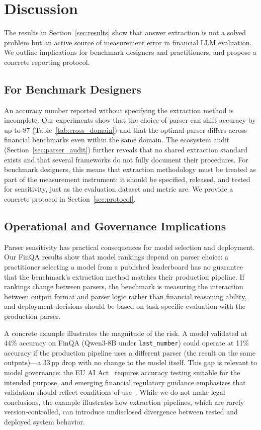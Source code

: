 \section{Discussion}
\label{sec:implications}

The results in Section~\ref{sec:results} show that answer extraction is not a solved problem but an active source of measurement error in financial LLM evaluation. We outline implications for benchmark designers and practitioners, and propose a concrete reporting protocol.

\subsection{For Benchmark Designers}
\label{sec:impl_benchmark}

An accuracy number reported without specifying the extraction method is incomplete. Our experiments show that the choice of parser can shift accuracy by up to 87\pp{} (Table~\ref{tab:cross_domain}) and that the optimal parser differs across financial benchmarks even within the same domain. The ecosystem audit (Section~\ref{sec:parser_audit}) further reveals that no shared extraction standard exists and that several frameworks do not fully document their procedures. For benchmark designers, this means that extraction methodology must be treated as part of the measurement instrument: it should be specified, released, and tested for sensitivity, just as the evaluation dataset and metric are. We provide a concrete protocol in Section~\ref{sec:protocol}.

\subsection{Operational and Governance Implications}
\label{sec:impl_operations}

Parser sensitivity has practical consequences for model selection and deployment. Our FinQA results show that model rankings depend on parser choice: a practitioner selecting a model from a published leaderboard has no guarantee that the benchmark's extraction method matches their production pipeline. If rankings change between parsers, the benchmark is measuring the interaction between output format and parser logic rather than financial reasoning ability, and deployment decisions should be based on task-specific evaluation with the production parser.

A concrete example illustrates the magnitude of the risk. A model validated at 44\% accuracy on FinQA (Qwen3-8B under \texttt{last\_number}) could operate at 11\% accuracy if the production pipeline uses a different parser (the \numparser{} result on the same outputs)---a 33\,pp drop with no change to the model itself. This gap is relevant to model governance: the EU AI Act~\cite{euaiact} requires accuracy testing suitable for the intended purpose, and emerging financial regulatory guidance emphasizes that validation should reflect conditions of use~\cite{sr2602}. While we do not make legal conclusions, the example illustrates how extraction pipelines, which are rarely version-controlled, can introduce undisclosed divergence between tested and deployed system behavior.

